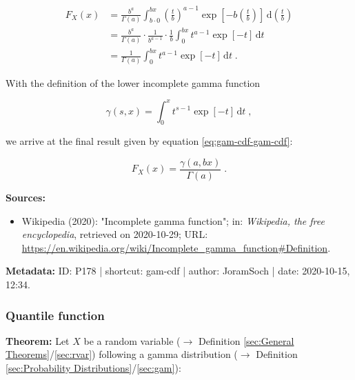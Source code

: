 \documentclass[a4paper,12pt,twoside]{book}
\begin{document}
\begin{equation} \label{eq:gam-cdf-gam-cdf-s2}
\begin{split}
F_X(x) &= \frac{b^a}{\Gamma(a)} \int_{b \cdot 0}^{b x} \left(\frac{t}{b}\right)^{a-1} \exp\left[-b \left(\frac{t}{b}\right)\right] \, \mathrm{d}\left(\frac{t}{b}\right) \\
&= \frac{b^a}{\Gamma(a)} \cdot \frac{1}{b^{a-1}} \cdot \frac{1}{b} \int_{0}^{b x} t^{a-1} \exp[-t] \, \mathrm{d}t \\
&= \frac{1}{\Gamma(a)} \int_{0}^{b x} t^{a-1} \exp[-t] \, \mathrm{d}t \; .
\end{split}
\end{equation}

With the definition of the lower incomplete gamma function

\begin{equation} \label{eq:gam-cdf-low-inc-gam-fct}
\gamma(s,x) = \int_{0}^{x} t^{s-1} \exp[-t] \, \mathrm{d}t \; ,
\end{equation}

we arrive at the final result given by equation \eqref{eq:gam-cdf-gam-cdf}:

\begin{equation} \label{eq:gam-cdf-gam-cdf-qed}
F_X(x) = \frac{\gamma(a,bx)}{\Gamma(a)} \; .
\end{equation}


\vspace{1em}
\textbf{Sources:}
\begin{itemize}
\item Wikipedia (2020): "Incomplete gamma function"; in: \textit{Wikipedia, the free encyclopedia}, retrieved on 2020-10-29; URL: \url{https://en.wikipedia.org/wiki/Incomplete_gamma_function#Definition}.
\end{itemize}


\vspace{1em}
\textbf{Metadata:} ID: P178 | shortcut: gam-cdf | author: JoramSoch | date: 2020-10-15, 12:34.
\vspace{1em}



\subsubsection[\textbf{Quantile function}]{Quantile function} \label{sec:gam-qf}
\setcounter{equation}{0}

\textbf{Theorem:} Let $X$ be a random variable ($\rightarrow$ Definition \ref{sec:General Theorems}/\ref{sec:rvar}) following a gamma distribution ($\rightarrow$ Definition \ref{sec:Probability Distributions}/\ref{sec:gam}):
\end{document}
